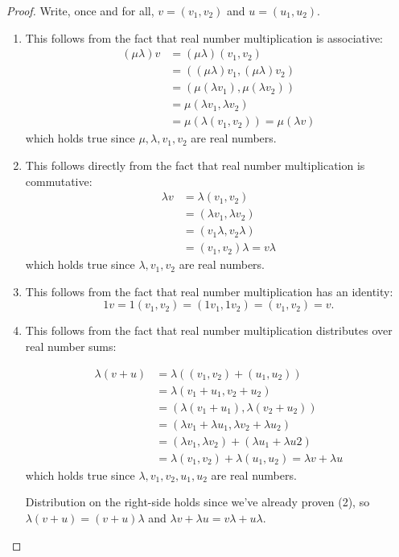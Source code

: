 \begin{proof}
	Write, once and for all, $v=(v_1,v_2)$ and $u=(u_1,u_2)$.
	\begin{enumerate}[(1)]
		\item This follows from the fact that real number multiplication is associative:
		\begin{align*}
			(\mu\lambda)v&=(\mu\lambda)(v_1,v_2)\\
			&=((\mu\lambda)v_1,(\mu\lambda)v_2)\\
			&=(\mu(\lambda v_1),\mu(\lambda v_2))\\
			&=\mu(\lambda v_1,\lambda v_2)\\
			&=\mu(\lambda (v_1,v_2))=\mu(\lambda v)
		\end{align*}which holds true since $\mu,\lambda,v_1,v_2$ are real numbers.
		
		\item This follows directly from the fact that real number multiplication is commutative:
		\begin{align*}
			\lambda v&=\lambda(v_1,v_2)\\
			&=(\lambda v_1,\lambda v_2)\\
			&=(v_1\lambda,v_2\lambda)\\
			&=(v_1,v_2)\lambda=v\lambda
		\end{align*}which holds true since $\lambda,v_1,v_2$ are real numbers.
		
		\item This follows from the fact that real number multiplication has an identity:
		\[1v=1(v_1,v_2)=(1v_1,1v_2)=(v_1,v_2)=v.\]
		
		\item This follows from the fact that real number multiplication distributes over real number sums:
		
		\begin{align*}
			\lambda(v+u)&=\lambda((v_1,v_2)+(u_1,u_2))\\
			&=\lambda(v_1+u_1,v_2+u_2)\\
			&=(\lambda(v_1+u_1),\lambda(v_2+u_2))\\
			&=(\lambda v_1+\lambda u_1,\lambda v_2+\lambda u_2)\\
			&=(\lambda v_1,\lambda v_2)+(\lambda u_1+\lambda u2)\\
			&=\lambda (v_1,v_2)+\lambda(u_1,u_2)=\lambda v+\lambda u
		\end{align*}which holds true since $\lambda, v_1,v_2,u_1,u_2$ are real numbers.
		
		Distribution on the right-side holds since we've already proven (2), so $\lambda(v+u)=(v+u)\lambda$ and $\lambda v+\lambda u=v\lambda+u\lambda$.
		

\end{enumerate}
\end{proof}
